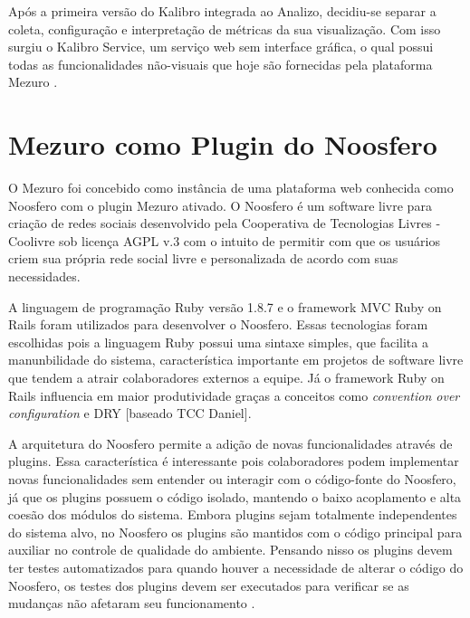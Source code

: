 Após a primeira versão do Kalibro integrada ao Analizo, decidiu-se separar a coleta, configuração e interpretação de métricas da sua visualização. Com isso surgiu o Kalibro Service, um serviço web sem interface gráfica, o qual possui todas as funcionalidades não-visuais que hoje são fornecidas pela plataforma Mezuro \cite{meirelles2013metrics}.


\section{Mezuro como Plugin do Noosfero}

O Mezuro foi concebido como instância de uma plataforma web conhecida como Noosfero com o plugin Mezuro ativado. O Noosfero é um software livre para criação de redes sociais desenvolvido pela Cooperativa de Tecnologias Livres - Coolivre sob licença AGPL v.3 com o intuito de permitir com que os usuários criem sua própria rede social livre e personalizada de acordo com suas necessidades.

A linguagem de programação Ruby versão 1.8.7 e o framework MVC Ruby on Rails foram utilizados para desenvolver o Noosfero. Essas tecnologias foram escolhidas pois a linguagem Ruby possui uma sintaxe simples, que facilita a manunbilidade do sistema, característica importante em projetos de software livre que tendem a atrair colaboradores externos a equipe. Já o framework Ruby on Rails influencia em maior produtividade graças a conceitos como \textit{convention over configuration} e DRY [baseado TCC Daniel].

A arquitetura do Noosfero permite a adição de novas funcionalidades através de plugins. Essa característica é interessante pois colaboradores podem implementar novas funcionalidades sem entender ou interagir com o código-fonte do Noosfero, já que os plugins possuem o código isolado, mantendo o baixo acoplamento e alta coesão dos módulos do sistema. Embora plugins sejam totalmente independentes do sistema alvo, no Noosfero os plugins são mantidos com o código principal para auxiliar no controle de qualidade do ambiente. Pensando nisso os plugins devem ter testes automatizados para quando houver a necessidade de alterar o código do Noosfero, os testes dos plugins devem ser executados para verificar se as mudanças não afetaram seu funcionamento \cite{noosfero2013plugins}.

